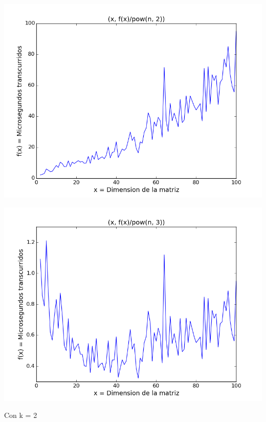 \begin{center}
\includegraphics[scale=0.54]{images/1potenciasobrecuadrado}
\end{center}


\begin{center}
\includegraphics[scale=0.54]{images/1potenciasobrecubo}
\end{center}


\vspace{2mm}

Con k = 2


